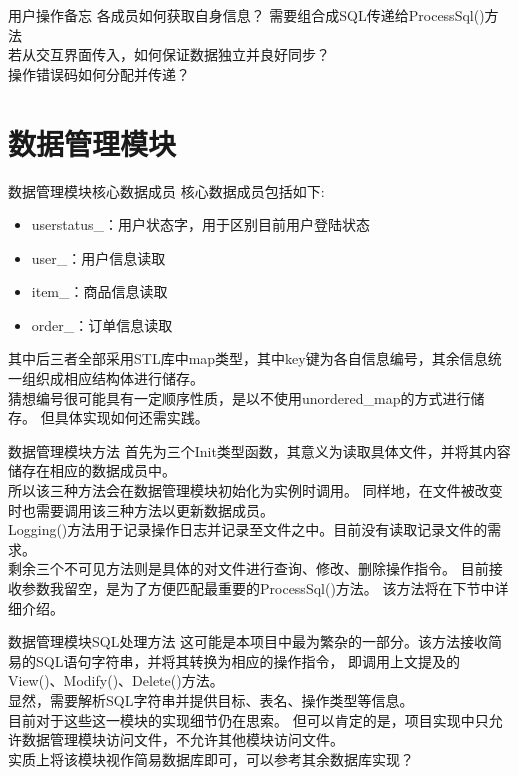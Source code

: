 \documentclass[10pt]{beamer}
\begin{document}
\begin{frame}{用户操作备忘}
    各成员如何获取自身信息？
    需要组合成SQL传递给ProcessSql()方法\\
    若从交互界面传入，如何保证数据独立并良好同步？\\
    操作错误码如何分配并传递？\\
\end{frame}

\section{数据管理模块}

\begin{frame}{数据管理模块核心数据成员}
    核心数据成员包括如下:\\
    \begin{itemize}
        \item userstatus\_：用户状态字，用于区别目前用户登陆状态
        \item user\_：用户信息读取
        \item item\_：商品信息读取
        \item order\_：订单信息读取
    \end{itemize}
    其中后三者全部采用STL库中map类型，其中key键为各自信息编号，其余信息统一组织成相应结构体进行储存。\\
    猜想编号很可能具有一定顺序性质，是以不使用unordered\_map的方式进行储存。
    但具体实现如何还需实践。\\
\end{frame}

\begin{frame}{数据管理模块方法}
    首先为三个Init类型函数，其意义为读取具体文件，并将其内容储存在相应的数据成员中。\\
    所以该三种方法会在数据管理模块初始化为实例时调用。
    同样地，在文件被改变时也需要调用该三种方法以更新数据成员。\\
    Logging()方法用于记录操作日志并记录至文件之中。目前没有读取记录文件的需求。\\
    剩余三个不可见方法则是具体的对文件进行查询、修改、删除操作指令。
    目前接收参数我留空，是为了方便匹配最重要的ProcessSql()方法。
    该方法将在下节中详细介绍。\\
\end{frame}

\begin{frame}{数据管理模块SQL处理方法}
    这可能是本项目中最为繁杂的一部分。该方法接收简易的SQL语句字符串，并将其转换为相应的操作指令，
    即调用上文提及的View()、Modify()、Delete()方法。\\
    显然，需要解析SQL字符串并提供目标、表名、操作类型等信息。\\
    目前对于这些这一模块的实现细节仍在思索。
    但可以肯定的是，项目实现中只允许数据管理模块访问文件，不允许其他模块访问文件。\\
    实质上将该模块视作简易数据库即可，可以参考其余数据库实现？
\end{frame}
\end{document}
